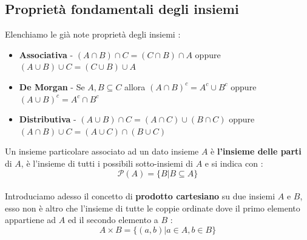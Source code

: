 \documentclass[12pt, letterpaper]{article}
\begin{document}
\subsection{Proprietà fondamentali degli insiemi}
Elenchiamo le già note proprietà degli insiemi :
\begin{itemize}
    \item \textbf{Associativa} - \( (A \cap B)\cap C =  (C \cap B)\cap A \)  oppure   \( (A \cup B)\cup C =  (C \cup B)\cup A \)
    \item \textbf{De Morgan} - Se \(A, B \subseteq C\) allora \((A \cap B)^c = A^c \cup B^c\) oppure \((A \cup B)^c = A^c \cap B^c\) 
    \item \textbf{Distributiva} - \( (A\cup B)\cap C = (A \cap C)\cup(B \cap C)  \) oppure \( (A\cap B)\cup C = (A \cup C)\cap(B \cup C)  \)
\end{itemize}
Un insieme particolare associato ad un dato insieme \(A\) è \textbf{l'insieme delle parti} di \(A\),
è l'insieme di tutti i possibili sotto-insiemi di \(A\) e si indica con :
\begin{equation}
    \mathcal{P}(A) = \{ B | B \subseteq A \}
\end{equation}
\\Introduciamo adesso il concetto di \textbf{prodotto cartesiano} su due insiemi \(A\) e \(B\),
 esso non è altro che l'insieme di tutte le coppie ordinate dove il primo elemento appartiene ad \(A\)
 ed il secondo elemento a \(B\) :
 \begin{equation}
    A \times B = \{ (a,b) | a\in A, b\in B\}
 \end{equation}
\end{document}
